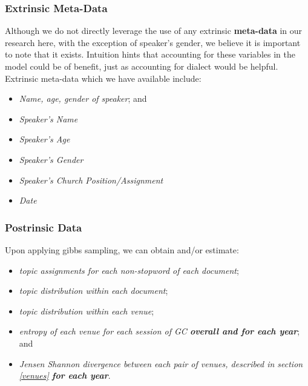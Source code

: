 \subsubsection{Extrinsic Meta-Data}
Although we do not directly leverage the use of any extrinsic \textbf{meta-data} in our research here, with the exception of speaker's gender, we believe it is important to note that it exists. Intuition hints that accounting for these variables in the model could be of benefit, just as accounting for dialect would be helpful. Extrinsic meta-data which we have available include:
	\begin{itemize}
		\item \textit{Name, age, gender of speaker}; and
		\item \textit{Speaker's Name}
		\item \textit{Speaker's Age}
		\item \textit{Speaker's Gender}
		\item \textit{Speaker's Church Position/Assignment}
		\item \textit{Date}
	\end{itemize}

\subsubsection{Postrinsic Data}
Upon applying gibbs sampling, we can obtain and/or estimate:
	\begin{itemize}
		\item \textit{topic assignments for each non-stopword of each document};
		\item \textit{topic distribution within each document};
		\item \textit{topic distribution within each venue};
		\item \textit{entropy of each venue for each session of GC \textbf{overall and for each year}}; and
		\item \textit{Jensen Shannon divergence between each pair of venues, described in section \ref{venues} \textbf{for each year}}.
	\end{itemize}



